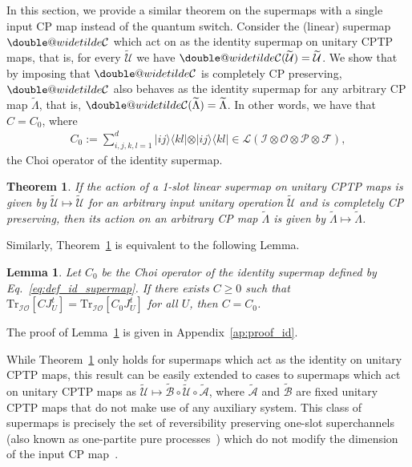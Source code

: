 \documentclass[a4paper,twocolumn,accepted=2022-10-23]{quantumarticle}
\makeatletter
\newcommand{\ketbra}[2]{\vert {#1} \rangle\!\langle {#2} \vert}
\newcommand{\Tr}[0]{{\mathrm{Tr}}}
\newcommand{\fcal}[0]{{\mathcal{F}}}
\newcommand{\ical}[0]{{\mathcal{I}}}
\newcommand{\ocal}[0]{{\mathcal{O}}}
\newcommand{\pcal}[0]{{\mathcal{P}}}
\newcommand{\lcal}[0]{{\mathcal{L}}}
\newcommand{\doublewidetilde}[1]{{%
  \mathpalette\double@widetilde{#1}%
}}
\newcommand{\double@widetilde}[2]{%
  \sbox\z@{$\m@th#1\widetilde{#2}$}%
  \ht\z@=.9\ht\z@
  \widetilde{\box\z@}%
}
\newcommand{\ttsmap}[1]{\doublewidetilde{\mbox{$\mathcal{#1}$}}}
\newcommand{\tmap}[1]{\widetilde{\mbox{$\mathcal{#1}$}}}
\newcommand{\tmapf}[1]{\widetilde{\mbox{$#1$}}}
\newtheorem{lem}{Lemma}
\newtheorem{thm}{Theorem}
\theoremstyle{definition}
\makeatother
\begin{document}
In this section, we provide a similar theorem on the supermaps with a single input CP map instead of the quantum switch.
Consider the (linear) supermap $\ttsmap{C}$ which act on as the identity supermap on unitary CPTP maps, that is, for every
$\tmap{U}$ we have $\ttsmap{C}(\tmap{U})=\tmap{U}$.
We show that by imposing that  $\ttsmap{C}$  is completely CP preserving, $\ttsmap{C}$ also behaves as the identity supermap for any arbitrary CP map $\tmapf{\Lambda}$, that is, $\ttsmap{C}(\tmapf{\Lambda})=\tmapf{\Lambda}$.
In other words, we have that $C = C_0$, where
\begin{align}
C_0 := \sum_{i,j,k,l=1}^d \ketbra{ij}{kl} \otimes \ketbra{ij}{kl} \in \lcal( \ical \otimes \ocal \otimes \pcal \otimes \fcal), \label{eq:def_id_supermap}
\end{align}
the Choi operator of the identity supermap.
\begin{thm}\label{thm:id_unique}
If the action of a 1-slot linear supermap on unitary CPTP maps is given by $\tmap{U} \mapsto \tmap{U}$ for an arbitrary input unitary operation $\tmap{U}$ and is completely CP preserving,
then its action on an arbitrary CP map $\tmapf{\Lambda}$ is given by $\tmapf{\Lambda} \mapsto \tmapf{\Lambda}$.
\end{thm}
Similarly, Theorem~\ref{thm:id_unique} is equivalent to the following Lemma.
\begin{lem}\label{lem:id_unique}
Let $C_0$ be the Choi operator of the identity supermap defined by Eq.~\eqref{eq:def_id_supermap}.
If there exists $C \geq 0$ such that $\Tr_{\ical \ocal} [ C J_{U}^t ] = \Tr_{\ical \ocal} [ C_0 J_{U}^t ] $ for all ${U} $,
then $C = C_0$.
\end{lem}
\noindent The proof of Lemma~\ref{lem:id_unique} is given in Appendix~\ref{ap:proof_id}.


While Theorem~\ref{thm:id_unique} only holds for supermaps which act as the identity on unitary CPTP maps, this
result can be easily extended to cases to supermaps which act on unitary CPTP maps as $\tmap{U} \mapsto \tmap{B} \circ \tmap{U} \circ \tmap{A}$, where $\tmap{A}$ and $\tmap{B}$ are fixed unitary CPTP maps that do not make use of any auxiliary system. This class of supermaps is precisely the set of reversibility preserving one-slot superchannels (also known as one-partite pure processes~\cite{indefinite_purification}) which do not modify the dimension of the input CP map~\cite{indefinite_reversible}.
\end{document}
